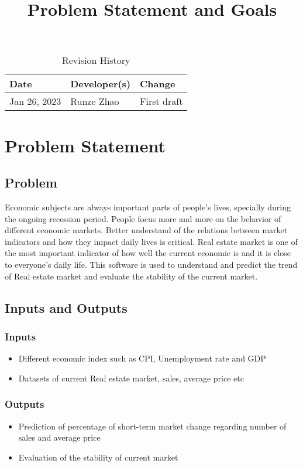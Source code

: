 \documentclass{article}
\title{Problem Statement and Goals\\\progname}
\author{\authname}
\date{}
\begin{document}
\maketitle

\begin{table}[hp]
\caption{Revision History} \label{TblRevisionHistory}
\begin{tabularx}{\textwidth}{llX}
\toprule
\textbf{Date} & \textbf{Developer(s)} & \textbf{Change}\\
\midrule
Jan 26, 2023 & Runze Zhao & First draft\\
\bottomrule
\end{tabularx}
\end{table}

\section{Problem Statement}

\subsection{Problem}
Economic subjects are always important parts of people's lives, specially during the ongoing recession period. People focus more and more on the behavior of different economic markets. Better understand of the relations between market indicators and how they impact daily lives is critical. 
Real estate market is one of the most important indicator of how well the current economic is and it is close to everyone's daily life. This software is used to understand and predict the trend of Real estate market and evaluate the stability of the current market. 
\subsection{Inputs and Outputs}
\subsubsection{Inputs}
\begin{itemize}
    \item Different economic index such as CPI, Unemployment rate and GDP
    \item Datasets of current Real estate market, sales, average price etc\
\end{itemize}

\subsubsection{Outputs}
\begin{itemize}
    \item Prediction of percentage of short-term market change regarding number of sales and average price
    \item Evaluation of the stability of current market
\end{itemize}
\end{document}
